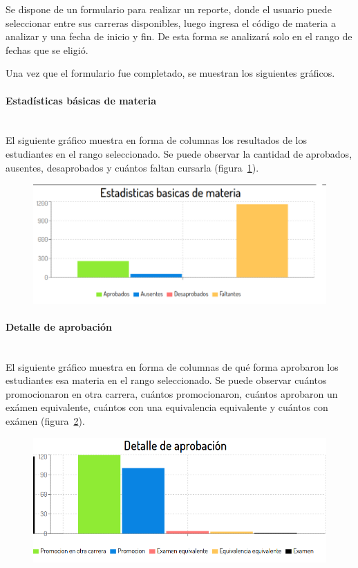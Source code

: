 Se dispone de un formulario para realizar un reporte, donde el usuario puede seleccionar entre sus carreras disponibles, luego ingresa el código de materia a analizar y una fecha de inicio y fin. De esta forma se analizará solo en el rango de fechas que se eligió.

Una vez que el formulario fue completado, se muestran los siguientes gráficos.

\paragraph{Estadísticas básicas de materia} \mbox{}\\
El siguiente gráfico muestra en forma de columnas los resultados de los estudiantes en el rango seleccionado. Se puede observar la cantidad de aprobados, ausentes, desaprobados y cuántos faltan cursarla  (figura~\ref{fig:sa-datos-basico}).

\begin{figure}[H]
  \centering
    \includegraphics[scale=0.4]{images/seguimiento-academico/sa-datosbasicos.png}
  \label{fig:sa-datos-basico}
\end{figure}

\paragraph{Detalle de aprobación} \mbox{}\\
El siguiente gráfico muestra en forma de columnas de qué forma aprobaron los estudiantes esa materia en el rango seleccionado. Se puede observar cuántos promocionaron en otra carrera, cuántos promocionaron, cuántos aprobaron un exámen equivalente, cuántos con una equivalencia equivalente y cuántos con exámen  (figura~\ref{fig:sa-detalle-aprobacion}).

\begin{figure}[H]
  \centering
    \includegraphics[scale=0.4]{images/seguimiento-academico/sa-detalleaprobacion.png}
  \label{fig:sa-detalle-aprobacion}
\end{figure}

